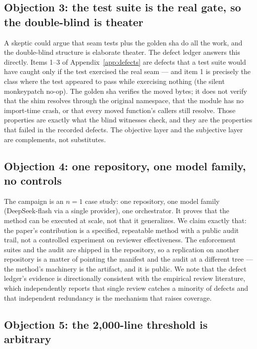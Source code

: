 \documentclass[11pt]{article}
\theoremstyle{definition}
\theoremstyle{plain}
\theoremstyle{remark}
\begin{document}
\subsection{Objection 3: the test suite is the real gate, so the double-blind is theater}

A skeptic could argue that seam tests plus the golden sha do all the work,
and the double-blind structure is elaborate theater. The defect ledger
answers this directly. Items 1--3 of Appendix~\ref{app:defects} are defects
that a test suite would have caught only if the test exercised the real seam
--- and item 1 is precisely the class where the test appeared to pass while
exercising nothing (the silent monkeypatch no-op). The golden sha verifies
the moved bytes; it does not verify that the shim resolves through the
original namespace, that the module has no import-time crash, or that every
moved function's callers still resolve. Those properties are exactly what the
blind witnesses check, and they are the properties that failed in the
recorded defects. The objective layer and the subjective layer are
complements, not substitutes.

\subsection{Objection 4: one repository, one model family, no controls}

The campaign is an $n=1$ case study: one repository, one model family
(DeepSeek-flash via a single provider), one orchestrator. It proves that the
method can be executed at scale, not that it generalizes. We claim exactly
that: the paper's contribution is a specified, repeatable method with a
public audit trail, not a controlled experiment on reviewer effectiveness.
The enforcement suites and the audit are shipped in the repository, so a
replication on another repository is a matter of pointing the manifest and
the audit at a different tree --- the method's machinery is the artifact, and
it is public. We note that the defect ledger's evidence is directionally
consistent with the empirical review literature, which independently reports
that single review catches a minority of defects and that independent
redundancy is the mechanism that raises coverage.

\subsection{Objection 5: the 2{,}000-line threshold is arbitrary}
\end{document}
